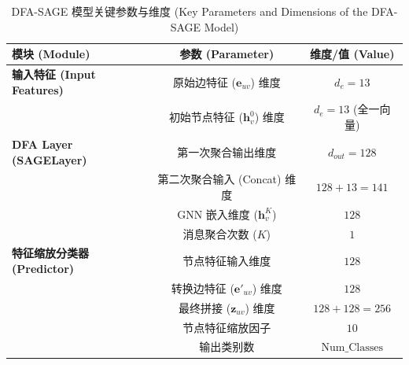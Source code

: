 \documentclass{article}
\begin{document}
\begin{table}[H]
\centering
\caption{DFA-SAGE 模型关键参数与维度 (Key Parameters and Dimensions of the DFA-SAGE Model)}
\label{tab:dfasage_parameters_booktabs}
\begin{tabular}{lcc}
\toprule %
\textbf{模块 (Module)} & \textbf{参数 (Parameter)} & \textbf{维度/值 (Value)} \\
\midrule %
\textbf{输入特征 (Input Features)} & 原始边特征 ($\mathbf{e}_{uv}$) 维度 & $d_e=13$ \\
& 初始节点特征 ($\mathbf{h}_v^0$) 维度 & $d_{e}=13$ (全一向量) \\
\midrule %
\textbf{DFA Layer (SAGELayer)} & 第一次聚合输出维度 & $d_{out}=128$ \\
& 第二次聚合输入 (Concat) 维度 & $128 + 13 = 141$ \\
& GNN 嵌入维度 ($\mathbf{h}_v^K$) & $128$ \\
& 消息聚合次数 ($K$) & $1$ \\
\midrule %
\textbf{特征缩放分类器 (Predictor)} & 节点特征输入维度 & $128$ \\
& 转换边特征 ($\mathbf{e}'_{uv}$) 维度 & $128$ \\
& 最终拼接 ($\mathbf{z}_{uv}$) 维度 & $128 + 128 = 256$ \\
& 节点特征缩放因子 & $10$ \\
& 输出类别数 & $\text{Num\_Classes}$ \\
\bottomrule %
\end{tabular}
\end{table}

\end{document}
